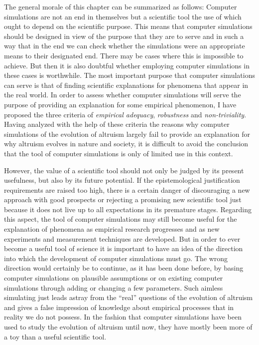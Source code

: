 The general morale of this chapter can be summarized as follows: Computer simulations are not an end
in themselves but a scientific tool the use of which ought to depend on the scientific purpose.
This means that computer simulations should be designed in view of the purpose
that they are to serve and in such a way that in the end we can check whether
the simulations were an appropriate means to their designated end. There may
be cases where this is impossible to achieve. But then it is also doubtful whether
employing computer simulations in these cases is worthwhile. The most important purpose that
computer simulations can serve is that of finding scientific explanations for
phenomena that appear in the real world. In order to assess whether computer
simulations will serve the purpose of providing an explanation for some
empirical phenomenon, I have
proposed the three criteria of {\em empirical adequacy}, {\em robustness} and
{\em non-triviality}. Having analyzed with the help of these criteria the
reasons why computer simulations of the evolution of altruism largely fail to
provide an explanation for why altruism evolves in nature and society, it is
difficult to avoid the conclusion that the tool of computer simulations is only
of limited use in this context.

However, the value of a scientific tool should
not only be judged by its present usefulness, but also by its future
potential. If the epistemological justification requirements are raised too
high, there is a certain danger of discouraging a new approach with good
prospects or rejecting a promising new scientific tool just because it does
not live up to all expectations in its premature stages. Regarding this
aspect, the tool of computer simulations may still become useful for the
explanation of phenomena as empirical research progresses
and as new experiments and measurement techniques are developed. But in order
to ever become a useful tool of science it is important to have an idea of the
direction into which the development of computer simulations must go. The
wrong direction would certainly be to continue, as it has been done before, by
basing computer simulations on plausible assumptions or on existing
computer simulations through adding or changing a few parameters. Such aimless
simulating just leads astray from the ``real'' questions of the evolution of
altruism and gives a false impression of knowledge about empirical processes
that in reality we do not possess. In the fashion that computer simulations
have been used to study the evolution of altruism until now, they have mostly
been more of a toy than a useful scientific tool.

